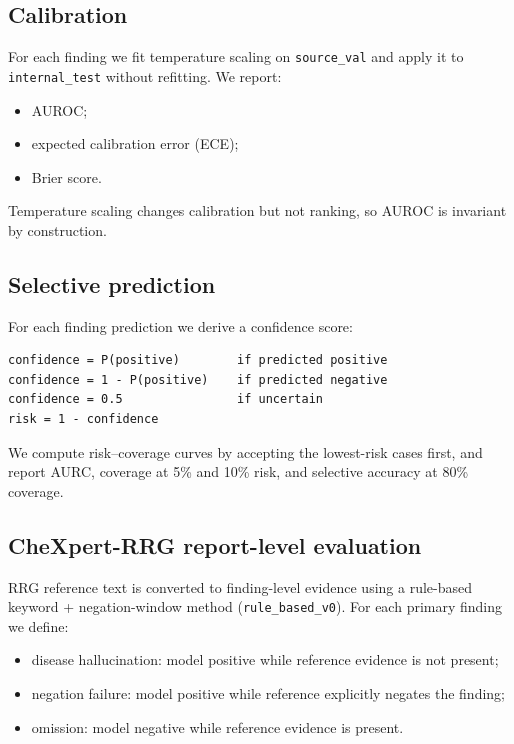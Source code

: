 \subsection{Calibration}

For each finding we fit temperature scaling on \texttt{source\_val} and apply it to \texttt{internal\_test} without refitting. We report:

\begin{itemize}
\item AUROC;
\item expected calibration error (ECE);
\item Brier score.
\end{itemize}

Temperature scaling changes calibration but not ranking, so AUROC is invariant by construction.

\subsection{Selective prediction}

For each finding prediction we derive a confidence score:

\begin{verbatim}
confidence = P(positive)        if predicted positive
confidence = 1 - P(positive)    if predicted negative
confidence = 0.5                if uncertain
risk = 1 - confidence
\end{verbatim}

We compute risk--coverage curves by accepting the lowest-risk cases first, and report AURC, coverage at 5\% and 10\% risk, and selective accuracy at 80\% coverage.

\subsection{CheXpert-RRG report-level evaluation}

RRG reference text is converted to finding-level evidence using a rule-based keyword + negation-window method (\texttt{rule\_based\_v0}). For each primary finding we define:

\begin{itemize}
\item disease hallucination: model positive while reference evidence is not present;
\item negation failure: model positive while reference explicitly negates the finding;
\item omission: model negative while reference evidence is present.
\end{itemize}

